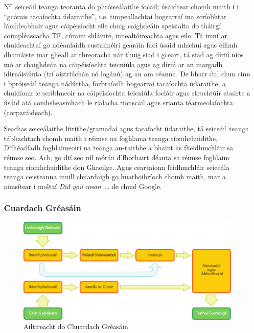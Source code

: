 \begin{multicols}{2}
Níl seiceáil teanga teoranta do phróiseálaithe focail; úsáidtear chomh maith í i ``gcórais tacaíochta údaraithe'', i.e. timpeallachtaí bogearraí ina scríobhtar lámhleabhair agus cáipéisíocht eile chuig caighdeáin speisialta do tháirgí coimpléascacha TF, cúraim shláinte, innealtóireachta agus eile. Tá imní ar chuideachtaí go ndéanfaidh custaiméirí gearáin faoi úsáid mhíchuí agus éilimh dhamáiste mar gheall ar threoracha nár thuig siad i gceart, tá siad ag díriú níos mó ar chaighdeán na cáipéisíochta teicniúla agus ag díriú ar an margadh idirnáisiúnta (trí aistriúchán nó logánú) ag an am céanna. De bharr dul chun cinn i bpróiseáil teanga nádúrtha, forbraíodh bogearraí tacaíochta údaraithe, a chuidíonn le scríbhneoir na cáipéisíochta teicniúla foclóir agus struchtúir abairte a úsáid atá comhsheasmhach le rialacha tionscail agus srianta téarmeolaíochta (corparáideach).


Seachas seiceálaithe litrithe/gramadaí agus tacaíocht údaraithe, tá seiceáil teanga tábhachtach chomh maith i réimse na foghlama teanga ríomhchuidithe. D’fhéadfadh foghlaimeoirí na teanga an-tairbhe a bhaint as fheidhmchláir sa réimse seo. Ach, go dtí seo níl mórán d’fhorbairt déanta sa réimse foghlaim teanga ríomhchuidithe don Ghaeilge. Agus ceartaíonn feidhmchláir seiceála teanga ceisteanna innill chuardaigh go huathoibríoch chomh maith, mar a aimsítear i moltaí \textit{Did you mean~\dots} de chuid Google.

\subsubsection{Cuardach Gréasáin}

\begin{figure}[htb]
  \center
  \includegraphics[width=\textwidth]{../_media/irish/web_search_architecture}
  \caption{Ailtireacht do Chuardach Gréasáin}
  \label{fig:websearcharch_de}
\end{figure}


\end{multicols}
